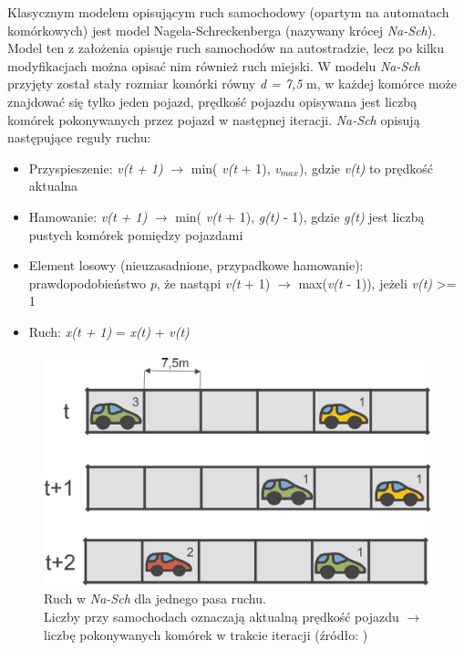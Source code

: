 \documentclass[a4paper,12pt]{article}
\begin{document}
			 Klasycznym modelem opisującym ruch samochodowy (opartym na automatach komórkowych) jest model Nagela-Schreckenberga \cite{nagel1992cellular} (nazywany krócej \textit{Na-Sch}). Model ten z założenia opisuje ruch samochodów na autostradzie, lecz po kilku modyfikacjach można opisać nim również ruch miejski. W modelu \textit{Na-Sch} przyjęty został stały rozmiar komórki równy \textit{d = 7,5} m, w każdej komórce może znajdować się tylko jeden pojazd, prędkość pojazdu opisywana jest liczbą komórek pokonywanych przez pojazd w następnej iteracji. \textit{Na-Sch} opisują następujące reguły ruchu:
			 \begin{itemize}
				\item Przyspieszenie: \textit{v(t + 1)} $\rightarrow$ min( \textit{v(t} + 1), \textit{v}$_{max}$), gdzie \textit{v(t)}	to prędkość aktualna
				\item Hamowanie: \textit{v(t + 1)} $\rightarrow$ min( \textit{v(t} + 1), \textit{g(t)} - 1), gdzie \textit{g(t)}	jest liczbą pustych komórek pomiędzy pojazdami
				\item Element losowy (nieuzasadnione, przypadkowe hamowanie): prawdopodobieństwo \textit{p}, że nastąpi \textit{v(t} + 1) $\rightarrow$ max(\textit{v(t} - 1)), jeżeli \textit{v(t)} >= 1
				\item Ruch: \textit{x(t + 1)} = \textit{x(t)} + \textit{v(t)}
			 \end{itemize}
			
			\begin{figure}[!htb]
				\centering
				\captionsetup{justification=centering,margin=2cm}
				\includegraphics[scale=0.35]{Na-Sch.jpg}

				\caption{Ruch w \textit{Na-Sch} dla jednego pasa ruchu. \\Liczby przy samochodach oznaczają aktualną prędkość pojazdu $\rightarrow$ liczbę pokonywanych komórek w trakcie iteracji (źródło: \cite{WBGO2009})}
			\end{figure}
			
\end{document}
